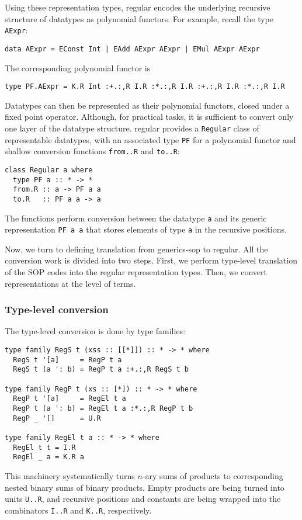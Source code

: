 \documentclass[runningheads]{llncs}
\newcommand{\K}[1]{\lstinline[style=fancy]{#1}}
\begin{document}
Using these representation types, \textsf{regular} encodes the underlying recursive structure of datatypes as polynomial functors. For example, recall the type \K{AExpr}:
\begin{lstlisting}[style=fancy]
data AExpr = EConst Int | EAdd AExpr AExpr | EMul AExpr AExpr
\end{lstlisting}
The corresponding polynomial functor is
\begin{lstlisting}[style=fancy]
type PF.AExpr = K.R Int :+.:,R I.R :*.:,R I.R :+.:,R I.R :*.:,R I.R
\end{lstlisting}
Datatypes can then be represented as their polynomial functors, closed under a fixed point operator. Although, for practical tasks, it is sufficient to convert only one layer of the datatype structure. \textsf{regular} provides a \K{Regular} class of representable datatypes, with an associated type \K{PF} for a polynomial functor and shallow conversion functions \K{from..R} and \K{to..R}:
\begin{lstlisting}[style=fancy]
class Regular a where
  type PF a :: * -> *
  from.R :: a -> PF a a
  to.R   :: PF a a -> a
\end{lstlisting}
The functions perform conversion between the datatype \K{a} and its generic representation \K{PF a a} that stores elements of type \K{a} in the recursive positions.

Now, we turn to defining translation from \textsf{generics-sop} to \textsf{regular}. All the conversion work is divided into two steps. First, we perform type-level translation of the SOP codes into the \textsf{regular} representation types. Then, we convert representations at the level of terms.

\subsubsection{Type-level conversion}

The type-level conversion is done by type families:
\begin{lstlisting}[style=fancy]
type family RegS t (xss :: [[*]]) :: * -> * where
  RegS t '[a]     = RegP t a
  RegS t (a ': b) = RegP t a :+.:,R RegS t b

type family RegP t (xs :: [*]) :: * -> * where
  RegP t '[a]     = RegEl t a
  RegP t (a ': b) = RegEl t a :*.:,R RegP t b
  RegP _ '[]      = U.R

type family RegEl t a :: * -> * where
  RegEl t t = I.R
  RegEl _ a = K.R a
\end{lstlisting}
This machinery systematically turns $n$-ary sums of products to corresponding nested binary sums of binary products. Empty products are being turned into units \K{U..R}, and recursive positions and constants are being wrapped into the combinators \K{I..R} and \K{K..R}, respectively.
\end{document}
